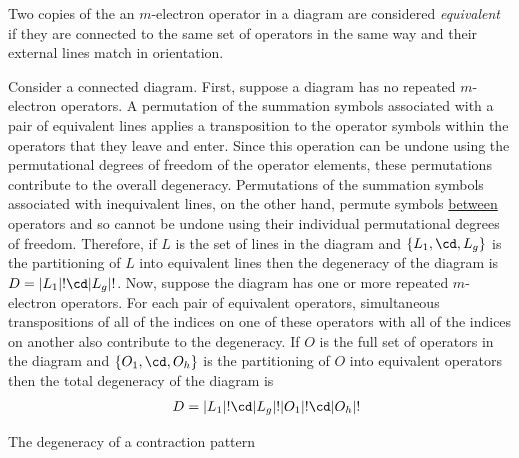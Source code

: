 \documentclass[11pt,fleqn]{article}
\numberwithin{equation}{section}
\begin{document}
\begin{dfn}
Two copies of the an $m$-electron operator in a diagram are considered \textit{equivalent} if they are connected to the same set of operators in the same way and their external lines match in orientation. 
\end{dfn}

\begin{drv}
Consider a connected diagram.
First, suppose a diagram has no repeated $m$-electron operators.
A permutation of the summation symbols associated with a pair of equivalent lines applies a transposition to the operator symbols within the operators that they leave and enter.
Since this operation can be undone using the permutational degrees of freedom of the operator elements, these permutations contribute to the overall degeneracy.
Permutations of the summation symbols associated with inequivalent lines, on the other hand, permute symbols \ul{between} operators and so cannot be undone using their individual permutational degrees of freedom.
Therefore, if $L$ is the set of lines in the diagram and $\{L_1,\cd, L_g\}$ is the partitioning of $L$ into equivalent lines then the degeneracy of the diagram is
$
  D
=
  |L_1|!\cd|L_g|!
$.
Now, suppose the diagram has one or more repeated $m$-electron operators.
For each pair of equivalent operators, simultaneous transpositions of all of the indices on one of these operators with all of the indices on another also contribute to the degeneracy.
If $O$ is the full set of operators in the diagram and $\{O_1,\cd,O_h\}$ is the partitioning of $O$ into equivalent operators then the total degeneracy of the diagram is
\begin{align}
&&
  D
=
  |L_1|!\cd|L_g|!
  |O_1|!\cd|O_h|!
\end{align}
\end{drv}

\begin{dfn}
The degeneracy of a contraction pattern 
\end{dfn}

\begin{drv}
\end{drv}
\end{document}

